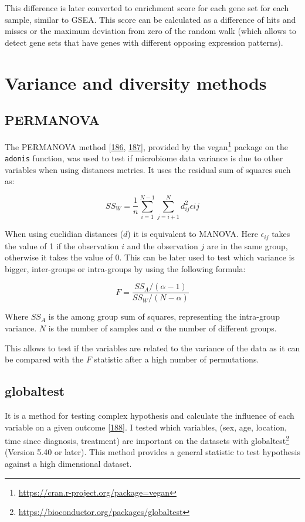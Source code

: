 \documentclass[
  a4paper,
]{book}
\DeclareRobustCommand{\href}[2]{#2\footnote{\url{#1}}}
\begin{document}
This difference is later converted to enrichment score for each gene set for each sample, similar to GSEA.
This score can be calculated as a difference of hits and misses or the maximum deviation from zero of the random walk (which allows to detect gene sets that have genes with different opposing expression patterns).

\hypertarget{variance}{%
\section{Variance and diversity methods}\label{variance}}

\hypertarget{permanova}{%
\subsection{PERMANOVA}\label{permanova}}

The PERMANOVA method {[}\protect\hyperlink{ref-anderson2001}{186}, \protect\hyperlink{ref-warton2012}{187}{]}, provided by the \href{https://cran.r-project.org/package=vegan}{vegan} package on the \texttt{adonis} function, was used to test if microbiome data variance is due to other variables when using distances metrics.
It uses the residual sum of squares such as:

\[
SS_W = \frac{1}{n} \sum_{i=1}^{N-1}\sum_{j=i+1}^N d_{ij}^2\epsilon{ij} 
\]

When using euclidian distances (\(d\)) it is equivalent to MANOVA.
Here \(\epsilon_{ij}\) takes the value of 1 if the observation \(i\) and the observation \(j\) are in the same group, otherwise it takes the value of 0.
This can be later used to test which variance is bigger, inter-groups or intra-groups by using the following formula:

\[
F = \dfrac{SS_A/(\alpha -1)}{SS_W/(N-\alpha)}
\]

Where \(SS_A\) is the among group sum of squares, representing the intra-group variance.
\(N\) is the number of samples and \(\alpha\) the number of different groups.

This allows to test if the variables are related to the variance of the data as it can be compared with the \(F\) statistic after a high number of permutations.

\hypertarget{globaltest}{%
\subsection{globaltest}\label{globaltest}}

It is a method for testing complex hypothesis and calculate the influence of each variable on a given outcome {[}\protect\hyperlink{ref-goeman2006}{188}{]}.
I tested which variables, (sex, age, location, time since diagnosis, treatment) are important on the datasets with \href{https://bioconductor.org/packages/globaltest}{globaltest} (Version 5.40 or later).
This method provides a general statistic to test hypothesis against a high dimensional dataset.
\end{document}
